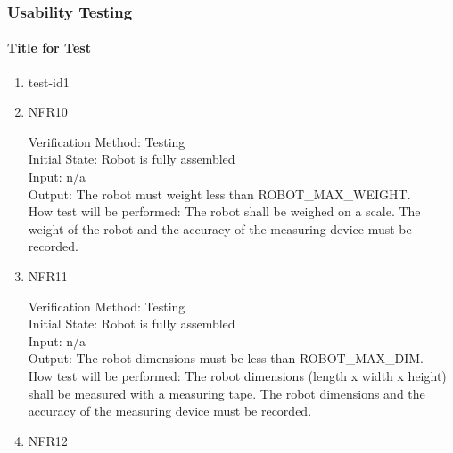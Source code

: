 \documentclass[12pt, titlepage]{article}
\begin{document}


\subsubsection{Usability Testing}
		
\paragraph{Title for Test}

\begin{enumerate}

\item{test-id1\\}


					
\item{NFR10\\}

Verification Method: Testing	\\				
Initial State: Robot is fully assembled	\\			
Input: n/a\\
Output: The robot must weight less than ROBOT\_MAX\_WEIGHT.\\
How test will be performed: The robot shall be weighed on a scale. The weight of the robot and the accuracy of the measuring device must be recorded.\\

\item{NFR11\\}

Verification Method: Testing\\					
Initial State: Robot is fully assembled	\\			
Input: n/a\\
Output: The robot dimensions must be less than ROBOT\_MAX\_DIM.	\\
How test will be performed: The robot dimensions (length x width x height) shall be measured with a measuring tape. The robot dimensions and the accuracy of the measuring device must be recorded.\\

\item{NFR12\\}


\end{enumerate}
\end{document}
